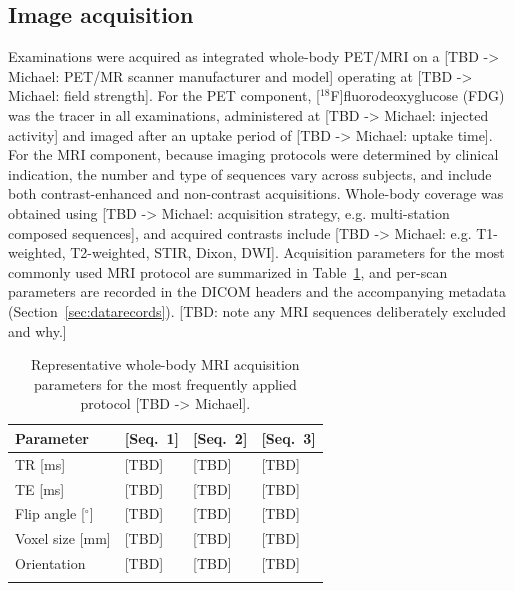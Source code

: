 \subsection*{Image acquisition}\label{subsec:acquisition}
Examinations were acquired as integrated whole-body PET/MRI on a [TBD -> Michael: PET/MR scanner manufacturer and model] operating at [TBD -> Michael: field strength].
For the PET component, [$^{18}$F]fluorodeoxyglucose (FDG) was the tracer in all examinations, administered at [TBD -> Michael: injected activity] and imaged after an uptake period of [TBD -> Michael: uptake time].
For the MRI component, because imaging protocols were determined by clinical indication, the number and type of sequences vary across subjects, and include both contrast-enhanced and non-contrast acquisitions.
Whole-body coverage was obtained using [TBD -> Michael: acquisition strategy, e.g. multi-station composed sequences], and acquired contrasts include [TBD -> Michael: e.g. T1-weighted, T2-weighted, STIR, Dixon, DWI].
Acquisition parameters for the most commonly used MRI protocol are summarized in Table~\ref{tab:acq}, and per-scan parameters are recorded in the DICOM headers and the accompanying metadata (Section~\ref{sec:datarecords}).
[TBD: note any MRI sequences deliberately excluded and why.]

\begin{table}[h]
\caption{Representative whole-body MRI acquisition parameters for the most frequently applied protocol [TBD -> Michael].}\label{tab:acq}
\begin{tabular}{@{}llll@{}}
\toprule
Parameter & [Seq.\ 1] & [Seq.\ 2] & [Seq.\ 3] \\
\midrule
TR [ms]            & [TBD] & [TBD] & [TBD] \\
TE [ms]            & [TBD] & [TBD] & [TBD] \\
Flip angle [$^\circ$] & [TBD] & [TBD] & [TBD] \\
Voxel size [mm]    & [TBD] & [TBD] & [TBD] \\
Orientation        & [TBD] & [TBD] & [TBD] \\
\botrule
\end{tabular}
\end{table}

